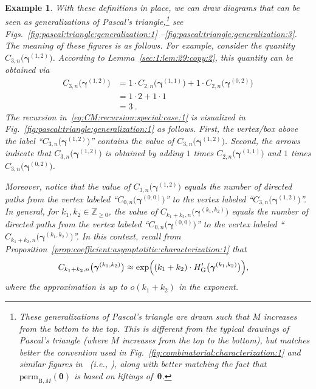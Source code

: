 \documentclass[journal,lettersize,twocolumn]{IEEEtran} %
\newtheorem{example}[theorem]{Example}
\newcommand{\vect}[1]{ \bm{#1} }
\newcommand{\vgam}{ \vect{\gamma} }
\newcommand{\sZ}{\mathbb{Z}}
\newcommand{\matr}[1]{ \bm{#1} }
\newcommand{\perm}{ \mathrm{perm} }
\newcommand{\permbM}[1]{\perm_{ \mathrm{B}, #1 }}
\newcommand{\Cgen}[2]{C_{#1,#2}}
\newcommand{\mtheta}{\matr{\theta}}
\newcommand{\HG}{H_{ \mathrm{G} }}
\newcommand{\ie}{\textit{i.e.}}
\begin{document}
\begin{example}
  With these definitions in place, we can draw diagrams that can be seen as
  generalizations of Pascal's triangle,\footnote{These generalizations of
    Pascal's triangle are drawn such that $M$ increases from the bottom to the
    top. This is different from the typical drawings of Pascal's triangle
    (where $M$ increases from the top to the bottom), but matches better the
    convention used in Fig.~\ref{fig:combinatorial:characterization:1} and
    similar figures in~\cite{Vontobel2013} (\ie, \cite[Figs.~7
    and~10]{Vontobel2013}), along with better matching the fact that
    $\permbM{M}(\mtheta)$ is based on \emph{liftings} of~$\mtheta$.} see
  Figs.~\ref{fig:pascal:triangle:generalization:1}%
  --\ref{fig:pascal:triangle:generalization:3}. The meaning of these figures
  is as follows. For example, consider the quantity
  $\Cgen{3}{n}\bigl(\vgam^{(1,2)}\bigr)$. According to
  Lemma~\ref{sec:1:lem:29:copy:2}, this quantity can be obtained via
  \begin{align}
    \Cgen{3}{n}\bigl(\vgam^{(1,2)}\bigr)
      &= 1 
           \cdot
           \Cgen{2}{n}\bigl(\vgam^{(1,1)}\bigr)
         +
         1
           \cdot
           \Cgen{2}{n}\bigl(\vgam^{(0,2)}\bigr) \nonumber \\
      &= 1
           \cdot 2
         +
         1
           \cdot 1 \nonumber \\
      &= 3 \ .
             \label{eq:CM:recursion:special:case:1}
  \end{align}
  The recursion in~\eqref{eq:CM:recursion:special:case:1} is visualized in
  Fig.~\ref{fig:pascal:triangle:generalization:1} as follows. First, the
  vertex/box above the label ``$\Cgen{3}{n}\bigl(\vgam^{(1,2)}\bigr)$''
  contains the value of $\Cgen{3}{n}\bigl(\vgam^{(1,2)}\bigr)$. Second, the
  arrows indicate that $\Cgen{3}{n}\bigl(\vgam^{(1,2)}\bigr)$ is obtained by
  adding $1$ times $\Cgen{2}{n}\bigl(\vgam^{(1,1)}\bigr)$ and $1$ times
  $\Cgen{3}{n}\bigl(\vgam^{(0,2)}\bigr)$.

  Moreover, notice that the value of $\Cgen{3}{n}\bigl(\vgam^{(1,2)}\bigr)$
  equals the number of directed paths from the vertex labeled
  ``$\Cgen{0}{n}\bigl(\vgam^{(0,0)}\bigr)$'' to the vertex labeled
  ``$\Cgen{3}{n}\bigl(\vgam^{(1,2)}\bigr)$''. In general, for
  $k_1, k_2 \in \sZ_{\geq 0}$, the value of
  $\Cgen{k_1+k_2}{n}\bigl(\vgam^{(k_1,k_2)}\bigr)$ equals the number of
  directed paths from the vertex labeled
  ``$\Cgen{0}{n}\bigl(\vgam^{(0,0)}\bigr)$'' to the vertex labeled
  ``$\Cgen{k_1+k_2}{n}\bigl(\vgam^{(k_1,k_2)}\bigr)$''. In this context,
  recall from
  Proposition~\ref{prop:coefficient:asymptotitic:characterization:1} that
  \begin{align*}
    \Cgen{k_1+k_2}{n}\bigl(\vgam^{(k_1,k_2)}\bigr)
      &\approx
         \exp
           \Bigl(
             (k_1 + k_2) \cdot \HG'\bigl( \vgam^{(k_1,k_2)} \bigr)
           \Bigr),
  \end{align*}
  where the approximation is up to $o(k_1+k_2)$ in the exponent.


\end{example}
\end{document}
